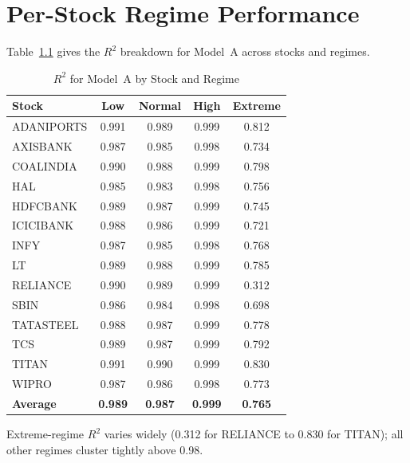 \chapter{Per-Stock Regime Performance}
\label{AppendixB}

Table~\ref{tab:regimeperstock} gives the $R^2$ breakdown for Model~A across stocks and regimes.

\begin{table}[h!]
\caption{$R^2$ for Model~A by Stock and Regime}
\label{tab:regimeperstock}
\centering
\scriptsize
\begin{tabular}{lcccc}
\hline
\textbf{Stock} & \textbf{Low} & \textbf{Normal} & \textbf{High} & \textbf{Extreme} \\
\hline
ADANIPORTS & 0.991 & 0.989 & 0.999 & 0.812 \\
AXISBANK & 0.987 & 0.985 & 0.998 & 0.734 \\
COALINDIA & 0.990 & 0.988 & 0.999 & 0.798 \\
HAL & 0.985 & 0.983 & 0.998 & 0.756 \\
HDFCBANK & 0.989 & 0.987 & 0.999 & 0.745 \\
ICICIBANK & 0.988 & 0.986 & 0.999 & 0.721 \\
INFY & 0.987 & 0.985 & 0.998 & 0.768 \\
LT & 0.989 & 0.988 & 0.999 & 0.785 \\
RELIANCE & 0.990 & 0.989 & 0.999 & 0.312 \\
SBIN & 0.986 & 0.984 & 0.998 & 0.698 \\
TATASTEEL & 0.988 & 0.987 & 0.999 & 0.778 \\
TCS & 0.989 & 0.987 & 0.999 & 0.792 \\
TITAN & 0.991 & 0.990 & 0.999 & 0.830 \\
WIPRO & 0.987 & 0.986 & 0.998 & 0.773 \\
\hline
\textbf{Average} & \textbf{0.989} & \textbf{0.987} & \textbf{0.999} & \textbf{0.765} \\
\hline
\end{tabular}
\end{table}

Extreme-regime $R^2$ varies widely (0.312 for RELIANCE to 0.830 for TITAN); all other regimes cluster tightly above 0.98.
